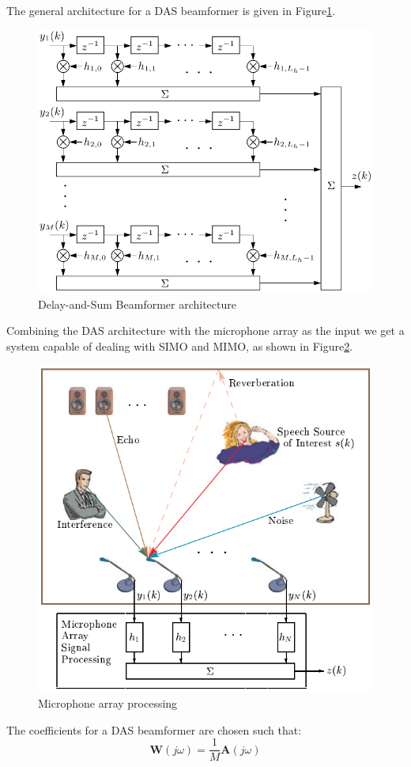 The general architecture for a DAS beamformer is given in Figure\;\ref{fig:das_arch}.
\begin{figure}[H]
    \centering
    \includegraphics[width=0.85\linewidth]{Beamformers/images/DAS_arch.png}
    \caption{Delay-and-Sum Beamformer architecture}\label{fig:das_arch}
\end{figure}

Combining the DAS architecture with the microphone array as the input
we get a system capable of dealing with SIMO and MIMO, as shown in
Figure\;\ref{fig:mic_array_proc}.

\begin{figure}[H]
    \centering
    \includegraphics[width=0.65\linewidth]{Beamformers/images/mic_array_proc.png}
    \caption{Microphone array processing}\label{fig:mic_array_proc}
\end{figure}

The coefficients for a DAS beamformer are chosen such that:
\begin{equation}
    \mathbf{W}(j\omega) = \frac{1}{M} \mathbf{A}(j\omega)
\end{equation}

